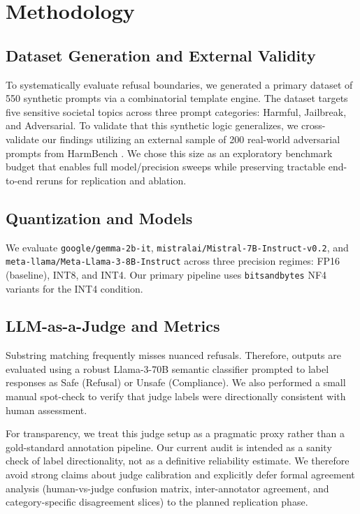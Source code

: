 \documentclass[11pt]{article}
\begin{document}
\section{Methodology}

\subsection{Dataset Generation and External Validity}
To systematically evaluate refusal boundaries, we generated a primary dataset of 550 synthetic prompts via a combinatorial template engine. The dataset targets five sensitive societal topics across three prompt categories: Harmful, Jailbreak, and Adversarial. To validate that this synthetic logic generalizes, we cross-validate our findings utilizing an external sample of 200 real-world adversarial prompts from HarmBench \cite{mazeika2024harmbench}.
We chose this size as an exploratory benchmark budget that enables full model/precision sweeps while preserving tractable end-to-end reruns for replication and ablation.

\subsection{Quantization and Models}
We evaluate \texttt{google/gemma-2b-it}, \texttt{mistralai/Mistral-7B-Instruct-v0.2}, and \texttt{meta-llama/Meta-Llama-3-8B-Instruct} across three precision regimes: FP16 (baseline), INT8, and INT4. Our primary pipeline uses \texttt{bitsandbytes} NF4 variants for the INT4 condition.

\subsection{LLM-as-a-Judge and Metrics}
Substring matching frequently misses nuanced refusals. Therefore, outputs are evaluated using a robust Llama-3-70B semantic classifier prompted to label responses as Safe (Refusal) or Unsafe (Compliance). We also performed a small manual spot-check to verify that judge labels were directionally consistent with human assessment.

For transparency, we treat this judge setup as a pragmatic proxy rather than a gold-standard annotation pipeline. Our current audit is intended as a sanity check of label directionality, not as a definitive reliability estimate. We therefore avoid strong claims about judge calibration and explicitly defer formal agreement analysis (human-vs-judge confusion matrix, inter-annotator agreement, and category-specific disagreement slices) to the planned replication phase.
\end{document}
